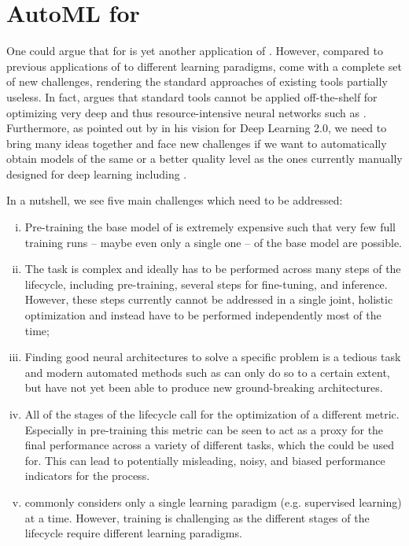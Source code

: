\documentclass[10pt]{article} %
\begin{document}
\section{AutoML for \LLMs}
\label{sec:automl-for-llms}

One could argue that \AutoML for \LLMs is yet another application of \AutoML. However, compared to previous applications of \AutoML to different learning paradigms, \LLMs come with a complete set of new challenges, rendering the standard approaches of existing \AutoML tools partially useless. In fact, \citet{godbole-github23} argues that standard \HPO tools cannot be applied off-the-shelf for optimizing very deep and thus resource-intensive neural networks such as \LLMs. Furthermore, as pointed out by \cite{hutter-blog22a} in his vision for Deep Learning 2.0, we need to bring many ideas together and face new challenges if we want to automatically obtain models of the same or a better quality level as the ones currently manually designed for deep learning including \LLMs.

In a nutshell, we see five main challenges which need to be addressed: 
\begin{enumerate}[(i)] 
    \item Pre-training the base model of \LLMs is extremely expensive such that very few full training runs -- maybe even only a single one -- of the \LLM base model are possible.
    \item The \AutoML task is complex and ideally has to be performed across many steps of the \LLM lifecycle, including pre-training, several steps for fine-tuning, and inference. However, these steps currently cannot be addressed in a single joint, holistic optimization and instead have to be performed independently most of the time;
    \item Finding good neural architectures to solve a specific problem is a tedious task and modern automated methods such as \NAS can only do so to a certain extent, but have not yet been able to produce new ground-breaking architectures.
    \item All of the stages of the \LLM lifecycle call for the optimization of a different metric. Especially in pre-training this metric can be seen to act as a proxy for the final performance across a variety of different tasks, which the \LLM could be used for. This can lead to potentially misleading, noisy, and biased performance indicators for the \AutoML process.
    \item \AutoML commonly considers only a single learning paradigm (e.g. supervised learning) at a time. However, training \LLMs is challenging as the different stages of the lifecycle require different learning paradigms.
\end{enumerate}
\end{document}
